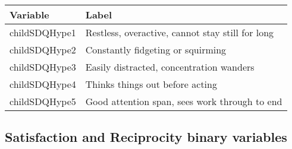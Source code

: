 \begin{table}[H]
\setlength{\tabcolsep}{20pt}
\begin{center}
\begin{tabular}{l l}
\hline
\textbf{Variable} & \textbf{Label} \\
\hline
childSDQHype1 & Restless, overactive, cannot stay still for long\\
childSDQHype2 & Constantly fidgeting or squirming\\
childSDQHype3 & Easily distracted, concentration wanders\\
childSDQHype4 & Thinks things out before acting \\
childSDQHype5 & Good attention span, sees work through to end\\
\hline
\end{tabular}
\end{center}
\end{table}



\subsection{Satisfaction and Reciprocity binary variables}
\setlength{\tabcolsep}{20pt}

